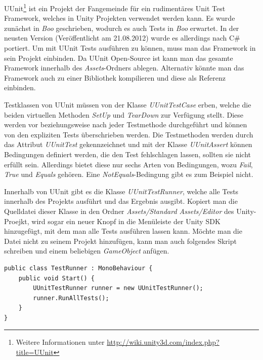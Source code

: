 UUnit\footnote{Weitere Informationen unter \url{http://wiki.unity3d.com/index.php?title=UUnit}} ist ein Projekt der Fangemeinde für ein rudimentäres Unit Test Framework, welches in Unity Projekten verwendet werden kann. Es wurde zunächst in \textit{Boo} geschrieben, wodurch es auch Tests in \textit{Boo} erwartet. In der neusten Version (Veröffentlicht am 21.08.2012) wurde es allerdings nach C\# portiert.
Um mit UUnit Tests ausführen zu können, muss man das Framework in sein Projekt einbinden. Da UUnit Open-Source ist kann man das gesamte Framework innerhalb des \textit{Assets}-Ordners ablegen. Alternativ könnte man das Framework auch zu einer Bibliothek kompilieren und diese als Referenz einbinden.

Testklassen von UUnit müssen von der Klasse \textit{UUnitTestCase} erben, welche die beiden virtuellen Methoden \textit{SetUp} und \textit{TearDown} zur Verfügung stellt. Diese werden vor beziehungsweise nach jeder Testmethode durchgeführt und können von den expliziten Tests überschrieben werden. Die Testmethoden werden durch das Attribut \textit{UUnitTest} gekennzeichnet und mit der Klasse \textit{UUnitAssert} können Bedingungen definiert werden, die den Test fehlschlagen lassen, sollten sie nicht erfüllt sein. Allerdings bietet diese nur sechs Arten von Bedingungen, wozu \textit{Fail}, \textit{True} und \textit{Equals} gehören. Eine \textit{NotEquals}-Bedingung gibt es zum Beispiel nicht.

Innerhalb von UUnit gibt es die Klasse \textit{UUnitTestRunner}, welche alle Tests innerhalb des Projekts ausführt und das Ergebnis ausgibt. Kopiert man die Quelldatei dieser Klasse in den Ordner \textit{Assets/Standard Assets/Editor} des Unity-Proejkt, wird sogar ein neuer Knopf in die Menüleiste der Unity SDK hinzugefügt, mit dem man alle Tests ausführen lassen kann. Möchte man die Datei nicht zu seinem Projekt hinzufügen, kann man auch folgendes Skript schreiben und einem beliebigen \textit{GameObject} anfügen.

\begin{lstlisting}[caption={[Beispiel um alle UUnit-Tests auszuführen]Beispiel um alle UUnit-Tests auszuführen\\
Muss an ein \textit{GameObject} angehängt werden, wodurch beim Start des Spiels alle Tests ausgeführt werden.}, label=code:UUnitTestRunner]
public class TestRunner : MonoBehaviour {
	public void Start() {
		UUnitTestRunner runner = new UUnitTestRunner();
		runner.RunAllTests();
	}
}
\end{lstlisting}

